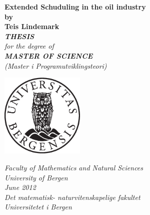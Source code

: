 \documentclass[12pt,twoside,onecolumn]{article}
\begin{document}
\thispagestyle{empty}
\begin{center}        %
  \vspace{5mm}          %
  \LARGE
  \textbf{Extended Schuduling in the oil industry} \\
  \Large
  \vspace{5mm}
  \textbf{by} \\
  \vspace{5mm}
  \large
  \textbf{Teis Lindemark} \\
  \vspace{30mm}
  \Large
  {\bf{\textsl{THESIS}}} \\
  \textsl{for the degree of} \\
  \vspace{2mm}
  {\bf{\textsl{MASTER OF SCIENCE}}} \\
  \vspace{5mm}
  {\large \textsl {(Master i Programutviklingsteori)}}\\
  \vspace{10mm}
  \centerline{\includegraphics[width=4cm,height=4cm]{uibugle}}
  \vspace{5mm}
  \textsl{Faculty of Mathematics and Natural Sciences} \\
  \textsl{University of Bergen} \\
  \vspace{10mm}
  \large
  \textsl{June 2012} \\
  \vspace{5mm}
  \normalsize
  \textsl{Det matematisk- naturvitenskapelige fakultet} \\
  \textsl{Universitetet i Bergen} \\
\end{center}
\end{document}
